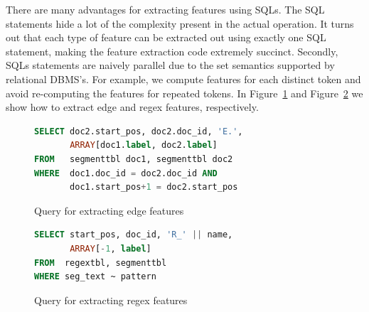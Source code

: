 \documentclass[11pt,letterpaper]{article}
\begin{document}
There are many advantages for extracting features using SQLs.  
The SQL statements hide a lot of the complexity  present  in the actual operation.
It turns out that each type of feature can be extracted out using exactly one SQL statement, 
making the feature extraction code extremely succinct.  
Secondly, SQLs statements are naively parallel due to the set semantics supported by relational DBMS's.
For example, we compute features for each distinct token and avoid re-computing the features for repeated tokens.  
In Figure~\ref{fig:edgefeatures} and Figure~\ref{fig:regexfeatures} we show how to extract edge
and regex features, respectively.

\begin{figure}
\centering
\begin{lstlisting}[language=SQL,breaklines=true]
SELECT doc2.start_pos, doc2.doc_id, 'E.', 
       ARRAY[doc1.label, doc2.label]
FROM   segmenttbl doc1, segmenttbl doc2
WHERE  doc1.doc_id = doc2.doc_id AND 
       doc1.start_pos+1 = doc2.start_pos
\end{lstlisting}
\caption{Query for extracting edge features}
\label{fig:edgefeatures}
\end{figure}

\begin{figure}
\centering
\begin{lstlisting}[language=SQL, breaklines=true]
SELECT start_pos, doc_id, 'R_' || name, 
       ARRAY[-1, label]
FROM  regextbl, segmenttbl
WHERE seg_text ~ pattern
\end{lstlisting}
\caption{Query for extracting regex features}
\label{fig:regexfeatures}
\end{figure}
\end{document}

